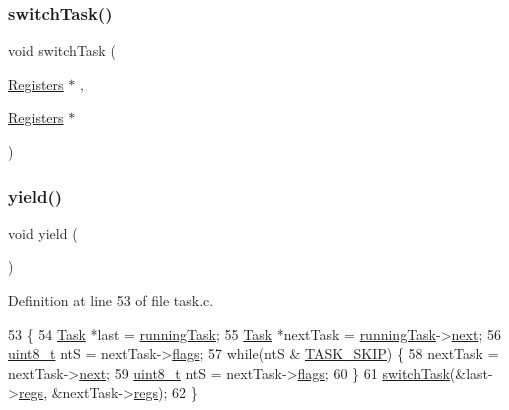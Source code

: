 \mbox{\label{a00059_a2425ca34147fccde2d1503332d21c5bd_a2425ca34147fccde2d1503332d21c5bd}} 
\subsubsection{\texorpdfstring{switch\+Task()}{switchTask()}}
{\footnotesize\ttfamily void switch\+Task (\begin{DoxyParamCaption}\item[{\hyperlink{a00147}{Registers} $\ast$}]{,  }\item[{\hyperlink{a00147}{Registers} $\ast$}]{ }\end{DoxyParamCaption})}

\mbox{\label{a00059_a58c8b2ad0ea491a6642e5e1cbd358c89_a58c8b2ad0ea491a6642e5e1cbd358c89}} 
\subsubsection{\texorpdfstring{yield()}{yield()}}
{\footnotesize\ttfamily void yield (\begin{DoxyParamCaption}{ }\end{DoxyParamCaption})}



Definition at line 53 of file task.\+c.


\begin{DoxyCode}
53              \{
54     \hyperlink{a00151}{Task} *last = \hyperlink{a00056_a2c195d425b4a6791b3a89f7b219f93d9_a2c195d425b4a6791b3a89f7b219f93d9}{runningTask};
55     \hyperlink{a00151}{Task} *nextTask = \hyperlink{a00056_a2c195d425b4a6791b3a89f7b219f93d9_a2c195d425b4a6791b3a89f7b219f93d9}{runningTask}->\hyperlink{a00151_a8b6b50960a19f7bae344ef0cc8ec4e7d_a8b6b50960a19f7bae344ef0cc8ec4e7d}{next};
56     \hyperlink{a00104_aba7bc1797add20fe3efdf37ced1182c5_aba7bc1797add20fe3efdf37ced1182c5}{uint8\_t} ntS = nextTask->\hyperlink{a00151_a9f83f1da7a5a83aa9a5e4849b66db8c5_a9f83f1da7a5a83aa9a5e4849b66db8c5}{flags};
57     \textcolor{keywordflow}{while}(ntS & \hyperlink{a00059_a74e226c76efbb6f22c9578b06dfb1bc5_a74e226c76efbb6f22c9578b06dfb1bc5}{TASK\_SKIP}) \{
58         nextTask = nextTask->\hyperlink{a00151_a8b6b50960a19f7bae344ef0cc8ec4e7d_a8b6b50960a19f7bae344ef0cc8ec4e7d}{next};
59         \hyperlink{a00104_aba7bc1797add20fe3efdf37ced1182c5_aba7bc1797add20fe3efdf37ced1182c5}{uint8\_t} ntS = nextTask->\hyperlink{a00151_a9f83f1da7a5a83aa9a5e4849b66db8c5_a9f83f1da7a5a83aa9a5e4849b66db8c5}{flags};
60     \}
61     \hyperlink{a00059_a2425ca34147fccde2d1503332d21c5bd_a2425ca34147fccde2d1503332d21c5bd}{switchTask}(&last->\hyperlink{a00151_a136b243ee52ff89e9ba97f4e4dba19bb_a136b243ee52ff89e9ba97f4e4dba19bb}{regs}, &nextTask->\hyperlink{a00151_a136b243ee52ff89e9ba97f4e4dba19bb_a136b243ee52ff89e9ba97f4e4dba19bb}{regs});
62 \}
\end{DoxyCode}
